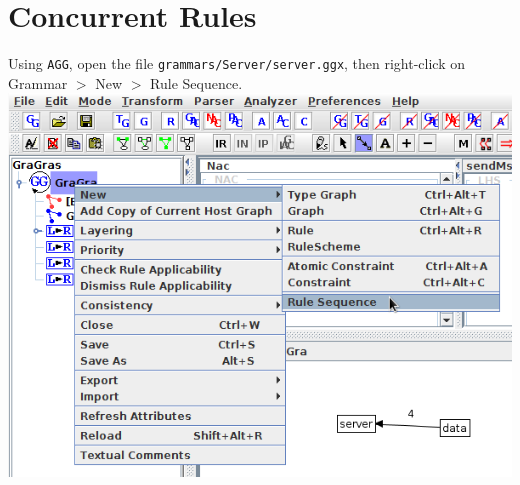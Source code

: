\documentclass[12pt]{article}
\newenvironment{tutorialstep}
	{\hspace{-\parindent}\begin{minipage}{\textwidth}}
    {\vspace{.3cm}\end{minipage}}
\begin{document}
\section{Concurrent Rules}

\begin{tutorialstep}
  Using \texttt{AGG}, open the file \texttt{grammars/Server/server.ggx}, then right-click on Grammar $>$ New $>$ Rule Sequence. \\

  \noindent
  \centering
  \includegraphics[scale = 0.6]{rule-sequence_01.png}
\end{tutorialstep}
\end{document}
